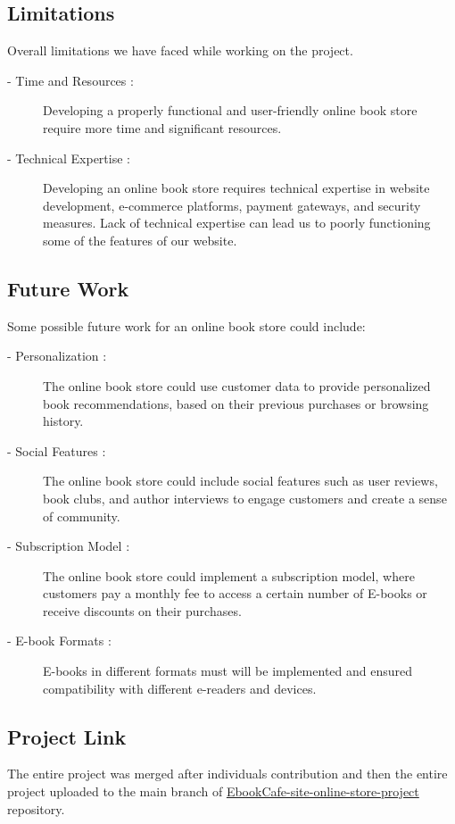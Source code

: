 \documentclass[12pt,a4paper]{article}
\begin{document}
\subsection{Limitations}
Overall limitations we have faced while working on the project.
\begin{description}
    \item[\hspace{7mm}- Time and Resources :] Developing a properly functional and user-friendly online book store require more time and significant resources.
    \item[\hspace{7mm}- Technical Expertise :] Developing an online book store requires technical expertise in website development, e-commerce platforms, payment gateways, and security measures. Lack of technical expertise can lead us to poorly functioning some of the features of our website.
\end{description}
\subsection{Future Work}
Some possible future work for an online book store could include:
\begin{description} 
    \item[\hspace{7mm}- Personalization :] The online book store could use customer data to provide personalized book recommendations, based on their previous purchases or browsing history.
    \item[\hspace{7mm}- Social Features :] The online book store could include social features such as user reviews, book clubs, and author interviews to engage customers and create a sense of community.
    \item[\hspace{7mm}- Subscription Model :] The online book store could implement a subscription model, where customers pay a monthly fee to access a certain number of E-books or receive discounts on their purchases.
    \item[\hspace{7mm}- E-book Formats :] E-books in different formats must will be implemented and ensured compatibility with different e-readers and devices.
\end{description}
\subsection{Project Link}
The entire project was merged after individuals contribution and then the entire project uploaded to the main branch of \href{https://github.com/janakmallik/EbookCafe-site-online-store-project}{EbookCafe-site-online-store-project} repository.
\end{document}
